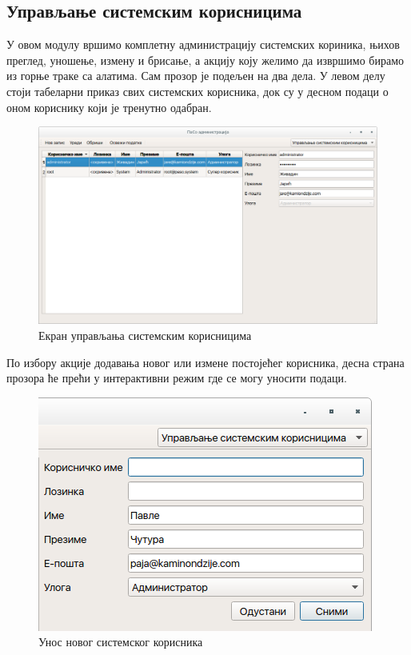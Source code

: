 \documentclass[a4paper, 12pt, diplomski]{etfcyr}
\begin{document}
			\newpage

			\subsection{Управљање системским корисницима}
				\begin{justify}
					У овом модулу вршимо комплетну администрацију системских кориника, њихов преглед, уношење, измену и брисање, а акцију коју желимо да извршимо бирамо из горње траке са алатима. Сам прозор је подељен на два дела. У левом делу стоји табеларни приказ свих системских корисника, док су у десном подаци о оном кориснику који је тренутно одабран.
					\begin{figure}[h]
						\begin{center}
							\includegraphics[width=1.0\textwidth]{manual/system_users.png}
						\end{center}
						\caption{Екран управљања системским корисницима}
						\label{figure:system_users}
					\end{figure}

					\newpage

					По избору акције додавања новог или измене постојећег корисника, десна страна прозора ће прећи у интерактивни режим где се могу уносити подаци.
					\begin{figure}[h]
						\begin{center}
							\includegraphics[width=.5\textwidth]{manual/system_user_edit.png}
						\end{center}
						\caption{Унос новог системског корисника}
						\label{figure:system_user_edit}
					\end{figure}


\end{justify}
\end{document}
